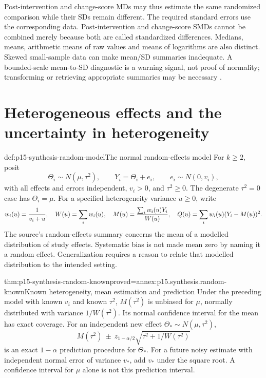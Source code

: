 Post-intervention and change-score MDs may thus estimate the same randomized
comparison while their SDs remain different. The required standard errors
use the corresponding data. Post-intervention and change-score SMDs cannot
be combined merely because both are called standardized differences. Medians,
means, arithmetic means of raw values and means of logarithms are also distinct.
Skewed small-sample data can make mean/SD summaries inadequate. A bounded-scale
mean-to-SD diagnostic is a warning signal, not proof of normality; transforming
or retrieving appropriate summaries may be necessary
\cite[secs.~10.5--10.6]{DeeksEtAl2024Cochrane10}.

\section{Heterogeneous effects and the uncertainty in heterogeneity}
\label{sec:p15-synthesis-heterogeneity}

\begin{hbdefinition}{def:p15-synthesis-random-model}{The normal random-effects model}
For \(k\geq2\), posit
\[
 \Theta_i\sim N(\mu,\tau^2),\qquad
 Y_i=\Theta_i+e_i,\qquad e_i\sim N(0,v_i),
\]
with all effects and errors independent, \(v_i>0\), and
\(\tau^2\geq0\). The degenerate \(\tau^2=0\) case has
\(\Theta_i=\mu\). For a specified heterogeneity variance \(u\geq0\),
write
\[
 w_i(u)={1\over v_i+u},\quad W(u)=\sum_iw_i(u),\quad
 M(u)={\sum_iw_i(u)Y_i\over W(u)},\quad
 Q(u)=\sum_iw_i(u)(Y_i-M(u))^2.
\]
The source's random-effects summary concerns the mean of a modelled
distribution of study effects. Systematic bias is not made mean zero by naming
it a random effect. Generalization requires a reason to relate that modelled
distribution to the intended setting.
\end{hbdefinition}

\begin{hbtheorem}{thm:p15-synthesis-random-known}{proved=annex:p15.synthesis.random-known}{Known heterogeneity, mean estimation and prediction}
Under the preceding model with known \(v_i\) and known \(\tau^2\),
\(M(\tau^2)\) is unbiased for \(\mu\), normally distributed with
variance \(1/W(\tau^2)\). Its normal confidence interval for the mean
has exact coverage. For an independent new effect
\(\Theta_*\sim N(\mu,\tau^2)\),
\[
 M(\tau^2)\ \pm\ z_{1-\alpha/2}
            \sqrt{\tau^2+1/W(\tau^2)}
\]
is an exact \(1-\alpha\) prediction procedure for \(\Theta_*\).
For a future noisy estimate with independent normal error of variance \(v_*\),
add \(v_*\) under the square root. A confidence interval for \(\mu\)
alone is not this prediction interval.
\end{hbtheorem}

